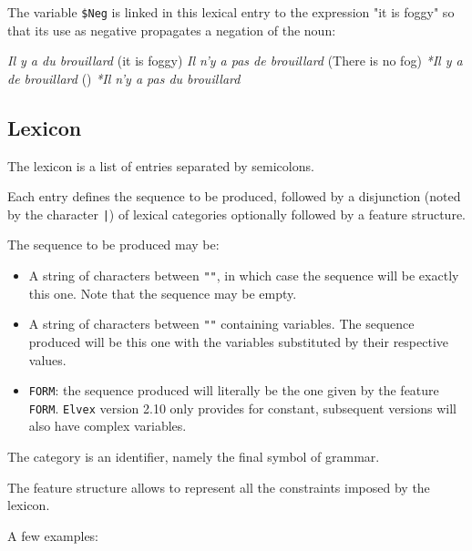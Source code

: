 \documentclass[11pt]{article}
\begin{document}
\begin{itemize}
The variable \verb#$Neg# is linked in this lexical entry to the expression "it is foggy" so that its use as negative propagates a negation of the noun:

\begin{exe}
\ex \begin{xlist} 
\ex \label{0-a} \textit{Il y a du brouillard} (it is foggy)
\ex \label{0-a} \textit{Il n'y a pas de brouillard} (There is no fog)
\ex \label{0-a} \textit{*Il y a de brouillard} ()
\ex \label{0-a} \textit{*Il n'y a pas du brouillard}
\end{xlist}
\end{exe}

\end{itemize}

\subsection{Lexicon}

The lexicon is a list of entries separated by semicolons.

Each entry defines the sequence to be produced, followed by a disjunction
(noted by the character \verb#|#) of lexical categories
optionally followed by a feature structure.

The sequence to be produced may be:

\begin{itemize}
\item A string of characters between \verb#""#, in which case the sequence
  will be exactly this one. Note that the sequence may be empty.

\item A string of characters between \verb#""# containing
  variables. The sequence produced will be this one with the variables
  substituted by their respective values.

\item \texttt{FORM}: the sequence produced will literally be the one
  given by the feature \texttt{FORM}. \texttt{Elvex} version 2.10 only provides for
  constant, subsequent versions will also have
  complex variables.

\end{itemize}

The category is an identifier, namely the final symbol of grammar.

The feature structure allows to represent all the
constraints imposed by the lexicon.

A few examples:
\end{document}
